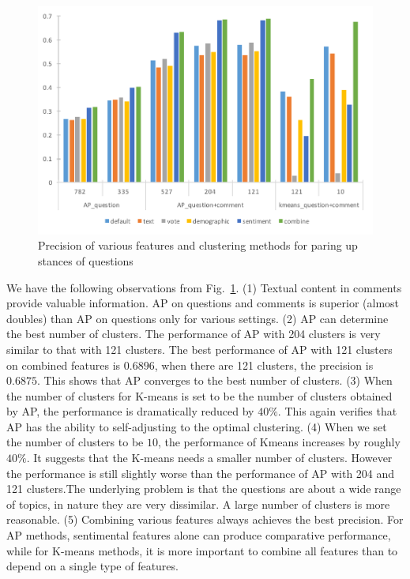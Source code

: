 \documentclass{llncs}
\begin{document}
\begin{figure}[htbp]
\begin{center}
\includegraphics[scale=0.5]{match.pdf}
\caption{Precision of various features and clustering methods for paring up stances of questions}
\label{fig:performancepair}
\end{center}
\end{figure}

We have the following observations from Fig.~\ref{fig:performancepair}. (1) Textual content in comments provide valuable information.  AP on questions and comments is superior (almost doubles) than AP on questions only for various settings. (2) AP can determine the best number of clusters. The performance of AP with 204 clusters is very similar to that with 121 clusters.  The best performance of AP with 121 clusters on combined features is $0.6896$, when there are 121 clusters, the precision is $0.6875$. This shows that AP converges to the best number of clusters. (3) When the number of clusters for K-means is set to be the number of clusters obtained by AP, the performance is dramatically reduced by $40\%$. This again verifies that AP has the ability to self-adjusting to the optimal clustering. (4) When we set the number of clusters to be $10$, the performance of Kmeans increases by roughly $40\%$. It suggests that the K-means needs a smaller number of clusters. However the performance is still slightly worse than the performance of AP with 204 and 121 clusters.The underlying problem is that the questions are about a wide range of topics, in nature they are very dissimilar. A large number of clusters is more reasonable. (5) Combining various features always achieves the best precision. For AP methods, sentimental features alone can produce comparative performance, while for K-means methods, it is more important to combine all features than to depend on a single type of features.   
\end{document}
